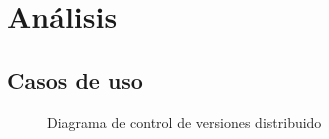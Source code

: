 %

\chapter{Análisis} %
	\label{cha:analisis}

% 
%
\section{Casos de uso} %
	\label{sec:casos_de_uso}
	
	\begin{center}
		\begin{figure}
			\centering
			\caption{Diagrama de control de versiones distribuido}
			\label{fig:cvdistrib}
			\centering
		\end{figure}
	\end{center}
